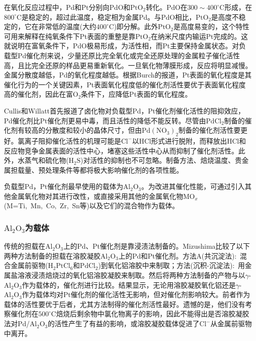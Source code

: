 在氧化反应过程中，\textrm{Pd}和\textrm{Pt}分别向\textrm{PdO}和$\mathrm{PtO}_2$转化。$\mathrm{PdO}$在$300\sim400^{\circ}\mathrm{C}$形成，在$800^{\circ}\mathrm{C}$是稳定的，超过此温度，稳定相为金属\textrm{Pd}。与\textrm{PdO}相比，$\mathrm{PtO}_2$是高度不稳定的，它在非常低的温度(大约$400^{\circ}\mathrm{C}$)即分解。此外$\mathrm{PtO}_2$是高度易变的，这个特性可用来解释在纯氧条件下\textrm{Pt}表面的重整是靠$\mathrm{PtO}_2$在纳米尺度内输运\textrm{Pt}完成的。这就说明在富氧条件下，\textrm{PdO}极易形成，为活性相，而\textrm{Pt}主要保持金属状态。对负载型\textrm{Pd}催化剂来说，少量还原比完全氧化或完全还原处理的金属粒子催化活性高，且比完全还原的样品更易重新氧化\cite{ACA218-197_2001}。一旦氧化物薄膜形成，反应将明显减慢。金属分散度越低，\textrm{Pd}的氧化程度越低。根据\textrm{Burch}的报道\cite{ACB5-149_1994}，\textrm{Pt}表面的氧化程度是其催化行为的一个关键因素，\textrm{Pt}表面氧化程度低的催化剂活性要优于表面氧化程度高的催化剂，因此在富$\mathrm{O}_2$条件下，应降低\textrm{Pt}表面的氧化程度。

\textrm{Cullis}和\textrm{Willatt}\cite{JCatal86-187_1984}首先报道了卤化物对负载型\textrm{Pd}，\textrm{Pt}催化剂催化活性的阻抑效应，\textrm{Pd}催化剂比\textrm{Pt}催化剂更易中毒，而且活性的降低不能反转。尽管由$\mathrm{PdCl}_2$制备的催化剂有较高的分散度和较小的晶体尺寸，但由$\mathrm{Pd}(\mathrm{NO}_3)_2$制备的催化剂活性要更好。氯离子阻抑催化活性的机理\cite{ACA203-37_2000,JC197-394_2001}可能是$\mathrm{Cl}^-$以\textrm{HCl}形式进行脱附，而释放出\textrm{HCl}和反应物竞争金属表面的活性中心，堵塞这些活性中心从而抑制了催化剂活性。此外，水蒸气和硫化物($\mathrm{H}_2\mathrm{S}$)对活性的抑制也不可忽略。制备方法、焙烧温度、贵金属担载量、预处理条件等都将极大影响催化剂的各项性能。

负载型\textrm{Pd}，\textrm{Pt}催化剂最早使用的载体为$\mathrm{Al}_2\mathrm{O}_3$。为改进其催化性能，可通过引入其他金属氧化物对其进行改性，或直接采用其他的金属氧化物$\mathrm{MO}_x$(\textrm{M=Ti,~Mn,~Co,~Zr,~Sn}等)以及它们的混合物作为载体。

\subsubsection{$\mathrm{Al}_2\mathrm{O}_3$为载体}
传统的担载在$\mathrm{Al}_2\mathrm{O}_3$上的\textrm{Pd}、\textrm{Pt}催化剂是靠浸渍法制备的。\textrm{Mizushima}\cite{ACA88-137_1992}比较了以下两种方法制备的担载在溶胶凝胶$\mathrm{Al}_2\mathrm{O}_3$上的\textrm{Pd}和\textrm{Pt}催化剂。方法\textrm{A}(共沉淀法):~混合金属前驱物($\mathrm{H}_2\mathrm{PtCl}_6$和$\mathrm{PdCl}_2$)到氧化铝溶胶中来制取；方法(沉积-沉淀法):~用金属盐溶液浸渍焙烧过的氧化铝溶胶凝胶来制取。然后将两种方法制备的产物与以$\gamma$-$\mathrm{Al}_2\mathrm{O}_3$作为载体的，催化剂进行比较。结果显示，无论用溶胶凝胶氧化铝还是$\gamma$-$\mathrm{Al}_2\mathrm{O}_3$作为载体均对\textrm{Pt}催化剂的催化活性无影响，但对催化剂影响较大。前者作为载体的活性要优于后者，尤其方法制得的催化剂活性最好。遗憾的是，他们没有考察催化剂在$500^{\circ}\mathrm{C}$焙烧后剩余物中氯化物离子的影响，因此不能得出是否溶胶凝胶法对\textrm{Pd}/$\mathrm{Al}_2\mathrm{O}_3$的活性产生了有益的影响，或溶胶凝胶载体促进了$\mathrm{Cl}^-$从金属前驱物中离开。


